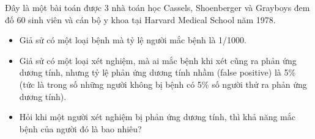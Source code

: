 \begin{frame}
     Đây là một bài toán được 3 nhà toán học Cassels, Shoenberger và Grayboys đem đố 60 sinh viên và cán bộ y khoa tại Harvard
Medical School năm 1978. 

  \begin{xrcs}
    \begin{itemize}
    \item Giả sử có một loại bệnh mà tỷ lệ người mắc bệnh là
      1/1000.
    \item Giả sử có một loại xét nghiệm, mà ai mắc bệnh khi xét
      cũng ra phản ứng dương tính, nhưng tỷ lệ phản ứng dương tính
      nhầm (false positive) là 5\% (tức là trong số những người không
      bị bệnh có 5\% số người thử ra phản ứng dương tính).
    \item Hỏi khi một
      người xét nghiệm bị phản ứng dương tính, thì khả năng mắc bệnh
      của người đó là bao nhiêu?
    \end{itemize}
  \end{xrcs}
\end{frame}





